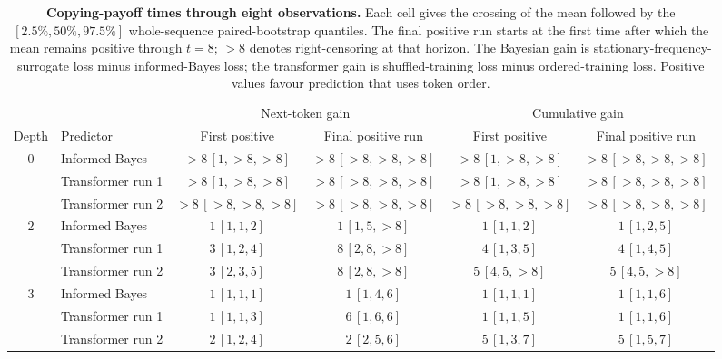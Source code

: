 \begin{table}[tbp]
\centering\scriptsize
\begin{tabular}{clcccc}
\toprule
& & \multicolumn{2}{c}{Next-token gain} & \multicolumn{2}{c}{Cumulative gain} \\
\cmidrule(lr){3-4}\cmidrule(lr){5-6}
Depth & Predictor & First positive & Final positive run & First positive & Final positive run \\
\midrule
$0$ & Informed Bayes & \(>8\,[1,>8,>8]\) & \(>8\,[>8,>8,>8]\) & \(>8\,[1,>8,>8]\) & \(>8\,[>8,>8,>8]\) \\
 & Transformer run 1 & \(>8\,[1,>8,>8]\) & \(>8\,[>8,>8,>8]\) & \(>8\,[1,>8,>8]\) & \(>8\,[>8,>8,>8]\) \\
 & Transformer run 2 & \(>8\,[>8,>8,>8]\) & \(>8\,[>8,>8,>8]\) & \(>8\,[>8,>8,>8]\) & \(>8\,[>8,>8,>8]\) \\
\addlinespace
$2$ & Informed Bayes & \(1\,[1,1,2]\) & \(1\,[1,5,>8]\) & \(1\,[1,1,2]\) & \(1\,[1,2,5]\) \\
 & Transformer run 1 & \(3\,[1,2,4]\) & \(8\,[2,8,>8]\) & \(4\,[1,3,5]\) & \(4\,[1,4,5]\) \\
 & Transformer run 2 & \(3\,[2,3,5]\) & \(8\,[2,8,>8]\) & \(5\,[4,5,>8]\) & \(5\,[4,5,>8]\) \\
\addlinespace
$3$ & Informed Bayes & \(1\,[1,1,1]\) & \(1\,[1,4,6]\) & \(1\,[1,1,1]\) & \(1\,[1,1,6]\) \\
 & Transformer run 1 & \(1\,[1,1,3]\) & \(6\,[1,6,6]\) & \(1\,[1,1,5]\) & \(1\,[1,1,6]\) \\
 & Transformer run 2 & \(2\,[1,2,4]\) & \(2\,[2,5,6]\) & \(5\,[1,3,7]\) & \(5\,[1,5,7]\) \\
\bottomrule
\end{tabular}
\caption{\textbf{Copying-payoff times through eight observations.}
Each cell gives the crossing of the mean followed by the
$[2.5\%,50\%,97.5\%]$ whole-sequence paired-bootstrap quantiles.
The final positive run starts at the first time after which the mean
remains positive through $t=8$; $>8$ denotes right-censoring at that
horizon. The Bayesian gain is stationary-frequency-surrogate loss
minus informed-Bayes loss; the transformer gain is shuffled-training
loss minus ordered-training loss. Positive values favour prediction
that uses token order.}
\label{tab:shared-shuffle-payoff-times}
\end{table}
